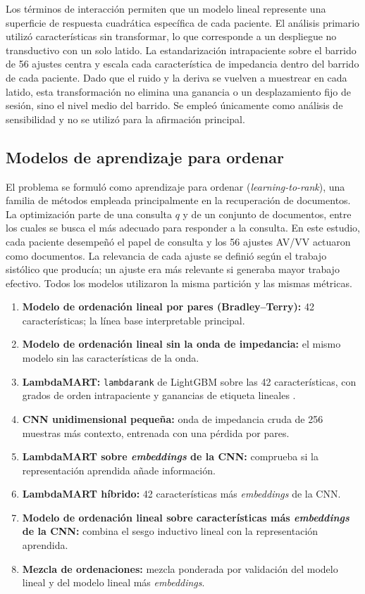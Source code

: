 \documentclass[11pt,a4paper]{article}
\begin{document}
Los términos de interacción permiten que un modelo lineal represente una
superficie de respuesta cuadrática específica de cada paciente. El análisis
primario utilizó características sin transformar, lo que corresponde a un
despliegue no transductivo con un solo latido. La estandarización intrapaciente
sobre el barrido de 56 ajustes centra y escala cada característica de impedancia
dentro del barrido de cada paciente. Dado que el ruido y la deriva se vuelven a
muestrear en cada latido, esta transformación no elimina una ganancia o un
desplazamiento fijo de sesión, sino el nivel medio del barrido. Se empleó
únicamente como análisis de sensibilidad y no se utilizó para la afirmación
principal.

\subsection{Modelos de aprendizaje para ordenar}

El problema se formuló como aprendizaje para ordenar
(\emph{learning-to-rank}), una familia de métodos empleada principalmente en la
recuperación de documentos. La optimización parte de una consulta $q$ y de un
conjunto de documentos, entre los cuales se busca el más adecuado para responder
a la consulta. En este estudio, cada paciente desempeñó el papel de consulta y
los 56 ajustes AV/VV actuaron como documentos. La relevancia de cada ajuste se
definió según el trabajo sistólico que producía; un ajuste era más relevante si
generaba mayor trabajo efectivo. Todos los modelos utilizaron la misma partición
y las mismas métricas.
\begin{enumerate}[leftmargin=1.5em,itemsep=0.2em]
  \item \textbf{Modelo de ordenación lineal por pares (Bradley--Terry):} 42
        características; la línea base interpretable principal.
  \item \textbf{Modelo de ordenación lineal sin la onda de impedancia:} el mismo
        modelo sin las características de la onda.
  \item \textbf{LambdaMART:} \texttt{lambdarank} de LightGBM sobre las 42
        características, con grados de orden intrapaciente y ganancias de
        etiqueta lineales \citep{burges2010,ke2017}.
  \item \textbf{CNN unidimensional pequeña:} onda de impedancia cruda de 256
        muestras más contexto, entrenada con una pérdida por pares.
  \item \textbf{LambdaMART sobre \emph{embeddings} de la CNN:} comprueba si la
        representación aprendida añade información.
  \item \textbf{LambdaMART híbrido:} 42 características más \emph{embeddings} de
        la CNN.
  \item \textbf{Modelo de ordenación lineal sobre características más
        \emph{embeddings} de la CNN:} combina el sesgo inductivo lineal con la
        representación aprendida.
  \item \textbf{Mezcla de ordenaciones:} mezcla ponderada por validación del
        modelo lineal y del modelo lineal más \emph{embeddings}.
\end{enumerate}
\end{document}
